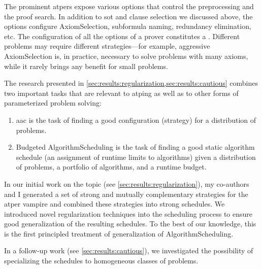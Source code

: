The prominent \glspl{atper} expose various options that control the preprocessing and the proof search.
In addition to \gls{sot} and clause selection we discussed above,
the options configure \gls{AxiomSelection}, subformula naming, redundancy elimination, etc.
The configuration of all the options of a prover constitutes a .
Different problems may require different strategies---for example, aggressive \gls{AxiomSelection} is, in practice, necessary to solve problems with many axioms, while it rarely brings any benefit for small problems.

The research presented in \cref{sec:results:regularization,sec:results:cautious} combines two important tasks
that are relevant to \gls{atping} as well as to other forms of parameterized problem solving:
\begin{enumerate}
\item \Gls{aac} \cite{DBLP:journals/jair/SchedeBTWBHT22} is the task of finding a good configuration (strategy) for a distribution of problems.
\item Budgeted \gls{AlgorithmScheduling} \cite{DBLP:journals/ec/KerschkeHNT19} is the task of finding a good static algorithm schedule (an assignment of runtime limits to algorithms) given a distribution of problems, a portfolio of algorithms, and a runtime budget.
\end{enumerate}

In our initial work on the topic \cite{DBLP:conf/ijcar/BartekCS24} (see \cref{sec:results:regularization}),
my co-authors and I generated a set of strong and mutually complementary strategies for the \gls{atper} \gls{vampire}
and combined these strategies into strong schedules.
We introduced novel regularization techniques into the scheduling process
to ensure good generalization of the resulting schedules.
To the best of our knowledge, this is the first principled treatment of generalization of \gls{AlgorithmScheduling}.

In a follow-up work \cite{DBLP:conf/paar/BartekC024} (see \cref{sec:results:cautious}), we investigated the possibility of specializing the schedules to homogeneous classes of problems.

